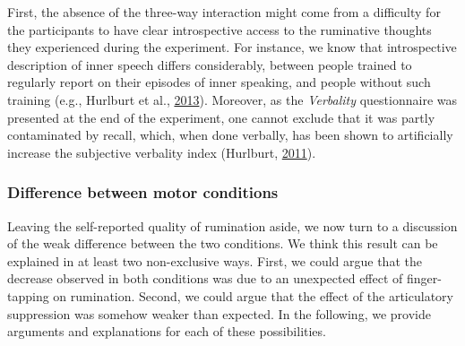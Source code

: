 \documentclass[a4paper,12pt,twoside,openright,oldfontcommands]{memoir}
\begin{document}
First, the absence of the three-way interaction might come from a difficulty for the participants to have clear introspective access to the ruminative thoughts they experienced during the experiment. For instance, we know that introspective description of inner speech differs considerably, between people trained to regularly report on their episodes of inner speaking, and people without such training (e.g., Hurlburt et al., \protect\hyperlink{ref-Hurlburt2013}{2013}). Moreover, as the \emph{Verbality} questionnaire was presented at the end of the experiment, one cannot exclude that it was partly contaminated by recall, which, when done verbally, has been shown to artificially increase the subjective verbality index (Hurlburt, \protect\hyperlink{ref-Hurlburt2011}{2011}).

\hypertarget{difference-between-motor-conditions}{%
\subsubsection{Difference between motor conditions}\label{difference-between-motor-conditions}}

Leaving the self-reported quality of rumination aside, we now turn to a discussion of the weak difference between the two conditions. We think this result can be explained in at least two non-exclusive ways. First, we could argue that the decrease observed in both conditions was due to an unexpected effect of finger-tapping on rumination. Second, we could argue that the effect of the articulatory suppression was somehow weaker than expected. In the following, we provide arguments and explanations for each of these possibilities.
\end{document}
